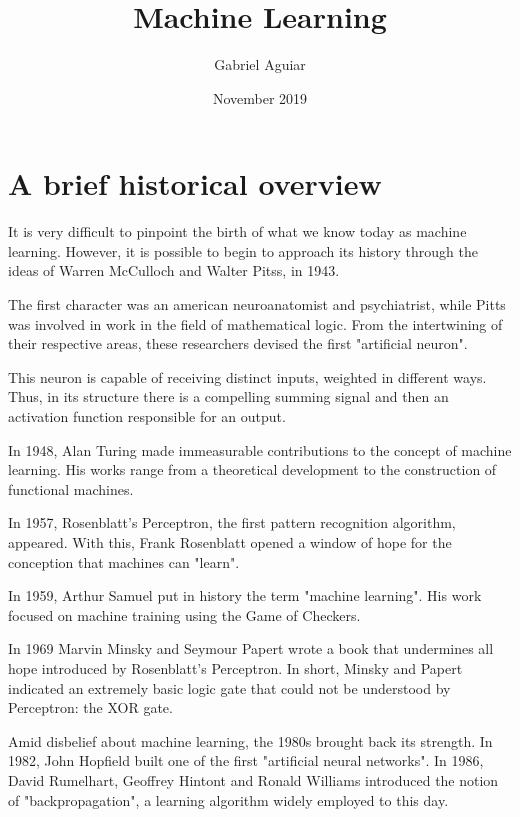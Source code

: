 \documentclass{article}
\title{Machine Learning}
\author{Gabriel Aguiar}
\date{November 2019}
\begin{document}
\maketitle

\section{A brief historical overview}

\hfill

It is very difficult to pinpoint the birth of what we know today as machine learning. However, it is possible to begin to approach its history through the ideas of Warren McCulloch and Walter Pitss, in 1943.

\hfill

The first character was an american neuroanatomist and psychiatrist, while Pitts was involved in work in the field of mathematical logic. From the intertwining of their respective areas, these researchers devised the first "artificial neuron".

\hfill

This neuron is capable of receiving distinct inputs, weighted in different ways. Thus, in its structure there is a compelling summing signal and then an activation function responsible for an output.

\hfill

In 1948, Alan Turing made immeasurable contributions to the concept of machine learning. His works range from a theoretical development to the construction of functional machines.

\hfill

In 1957, Rosenblatt's Perceptron, the first pattern recognition algorithm, appeared. With this, Frank Rosenblatt opened a window of hope for the conception that machines can "learn".

\hfill

In 1959, Arthur Samuel put in history the term "machine learning". His work focused on machine training using the Game of Checkers.

\hfill

In 1969 Marvin Minsky and Seymour Papert wrote a book that undermines all hope introduced by Rosenblatt's Perceptron. In short, Minsky and Papert indicated an extremely basic logic gate that could not be understood by Perceptron: the XOR gate.

\hfill

Amid disbelief about machine learning, the 1980s brought back its strength. In 1982, John Hopfield built one of the first "artificial neural networks". In 1986, David Rumelhart, Geoffrey Hintont and Ronald Williams introduced the notion of "backpropagation", a learning algorithm widely employed to this day.
\end{document}
